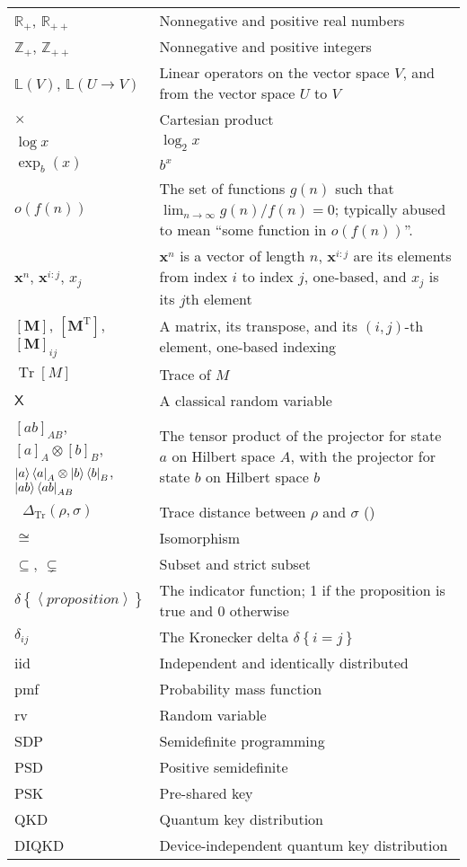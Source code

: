 \documentclass[10pt, a4paper]{article}
\numberwithin{equation}{section} %
\theoremstyle{definition}
\theoremstyle{plain}
\newcommand{\?}{\mathrel{?}} %
\newcommand{\Z}{\mathbb{Z}} %
\newcommand{\R}{\mathbb{R}} %
\newcommand{\Lin}[1]{\mathbb{L}\left(#1\right)}
\newcommand{\tpose}{\mathrm{T}}
\newcommand{\cvec}[1]{\boldsymbol{\mathbf{#1}}}    %
\newcommand{\matr}[2][]{\left[\mathbf{#2}#1\right]} %
\newcommand{\angleb}[1]{\left\langle #1 \right\rangle} %
\newcommand{\indic}[1]{\delta{\left\{#1\right\}}} %
\newcommand{\Tr}[2][]{\mathop{\mathrm{Tr}#1}\left[ #2 \right]} %
\newcommand{\Trdist}[2]{\mathop{}\Delta_\mathrm{Tr}\left(#1, #2\right)}
\newcommand{\crv}[1]{\mathsf{#1}}
\newcommand{\proj}[2][]{{[#2]}_{#1}}
\begin{document}
    \begin{center}
      \begin{longtable*}{p{0.2\linewidth}|p{0.8\linewidth}}
        \(\R_+\), \(\R_{++}\) & Nonnegative and positive real numbers \\
        \(\Z_+\), \(\Z_{++}\) & Nonnegative and positive integers \\
        \(\Lin{V}\), \(\Lin{U\to V}\) & Linear operators on the vector space \(V\), and from the vector space \(U\) to \(V\) \\
        \(\times\) & Cartesian product \\
        \(\log x\) & \(\log_2 x\) \\
        \(\exp_b(x)\) & \(b^x\) \\
        \(o(f(n))\) & The set of functions \(g(n)\) such that \(\lim_{n\to\infty} g(n)/f(n) = 0\); typically abused to mean ``some function in \(o(f(n))\)''. \\
        \(\cvec{x}^n\), \(\cvec{x}^{i:j}\), \(x_j\) & \(\cvec{x}^n\) is a vector of length \(n\), \(\cvec{x}^{i:j}\) are its elements from index \(i\) to index \(j\), one-based, and \(x_j\) is its \(j\)th element \\
        \(\matr{M}\), \(\matr[^{\tpose}]{M}\), \(\matr{M}_{ij}\) & A matrix, its transpose, and its \((i,j)\)-th element, one-based indexing \\
        \(\Tr{M}\) & Trace of \(M\) \\
        \(\crv{X}\) & A classical random variable \\
        \(\proj[AB]{ab}\), \(\proj[A]{a} \otimes \proj[B]{b}\), \({\ket{a}\bra{a}}_A \otimes {\ket{b}\bra{b}}_B\), \({\ket{ab}\bra{ab}}_{AB}\) & The tensor product of the projector for state \(a\) on Hilbert space \(A\), with the projector for state \(b\) on Hilbert space \(b\) \\
        \(\Trdist{\rho}{\sigma}\) & Trace distance between \(\rho\) and \(\sigma\) () \\
        \(\cong\) & Isomorphism \\
        \(\subseteq\), \(\subsetneq\) & Subset and strict subset \\
        \(\indic{\angleb{proposition}}\) & The indicator function; 1 if the proposition is true and 0 otherwise \\
        \(\delta_{ij}\) & The Kronecker delta \(\indic{i = j}\) \\
        iid & Independent and identically distributed \\
        pmf & Probability mass function \\
        rv & Random variable \\
        SDP & Semidefinite programming \\
        PSD & Positive semidefinite \\
        PSK & Pre-shared key \\
        QKD & Quantum key distribution \\
        DIQKD & Device-independent quantum key distribution \\
      \end{longtable*}
    \end{center}
    \clearpage
\end{document}
